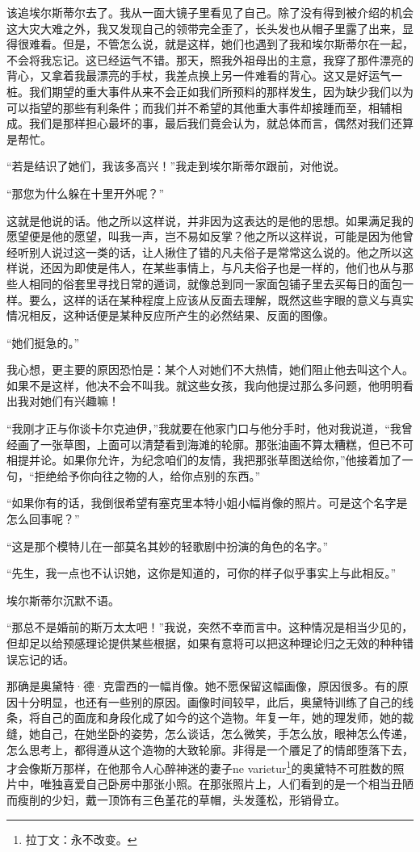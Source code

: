 \par 该追埃尔斯蒂尔去了。我从一面大镜子里看见了自己。除了没有得到被介绍的机会这大灾大难之外，我又发现自己的领带完全歪了，长头发也从帽子里露了出来，显得很难看。但是，不管怎么说，就是这样，她们也遇到了我和埃尔斯蒂尔在一起，不会将我忘记。这已经运气不错。那天，照我外祖母出的主意，我穿了那件漂亮的背心，又拿着我最漂亮的手杖，我差点换上另一件难看的背心。这又是好运气一桩。我们期望的重大事件从来不会正如我们所预料的那样发生，因为缺少我们以为可以指望的那些有利条件；而我们并不希望的其他重大事件却接踵而至，相辅相成。我们是那样担心最坏的事，最后我们竟会认为，就总体而言，偶然对我们还算是帮忙。
\par “若是结识了她们，我该多高兴！”我走到埃尔斯蒂尔跟前，对他说。
\par “那您为什么躲在十里开外呢？”
\par 这就是他说的话。他之所以这样说，并非因为这表达的是他的思想。如果满足我的愿望便是他的愿望，叫我一声，岂不易如反掌？他之所以这样说，可能是因为他曾经听别人说过这一类的话，让人揪住了错的凡夫俗子是常常这么说的。他之所以这样说，还因为即使是伟人，在某些事情上，与凡夫俗子也是一样的，他们也从与那些人相同的俗套里寻找日常的遁词，就像总到同一家面包铺子里去买每日的面包一样。要么，这样的话在某种程度上应该从反面去理解，既然这些字眼的意义与真实情况相反，这种话便是某种反应所产生的必然结果、反面的图像。
\par “她们挺急的。”
\par 我心想，更主要的原因恐怕是：某个人对她们不大热情，她们阻止他去叫这个人。如果不是这样，他决不会不叫我。就这些女孩，我向他提过那么多问题，他明明看出我对她们有兴趣嘛！
\par “我刚才正与你谈卡尔克迪伊，”我就要在他家门口与他分手时，他对我说道，“我曾经画了一张草图，上面可以清楚看到海滩的轮廓。那张油画不算太糟糕，但已不可相提并论。如果你允许，为纪念咱们的友情，我把那张草图送给你，”他接着加了一句，“拒绝给予你向往之物的人，给你点别的东西。”
\par “如果你有的话，我倒很希望有塞克里本特小姐小幅肖像的照片。可是这个名字是怎么回事呢？”
\par “这是那个模特儿在一部莫名其妙的轻歌剧中扮演的角色的名字。”
\par “先生，我一点也不认识她，这你是知道的，可你的样子似乎事实上与此相反。”
\par 埃尔斯蒂尔沉默不语。
\par “那总不是婚前的斯万太太吧！”我说，突然不幸而言中。这种情况是相当少见的，但却足以给预感理论提供某些根据，如果有意将可以把这种理论归之无效的种种错误忘记的话。
\par 那确是奥黛特·德·克雷西的一幅肖像。她不愿保留这幅画像，原因很多。有的原因十分明显，也还有一些别的原因。画像时间较早，此后，奥黛特训练了自己的线条，将自己的面庞和身段化成了如今的这个造物。年复一年，她的理发师，她的裁缝，她自己，在她坐卧的姿势，怎么谈话，怎么微笑，手怎么放，眼神怎么传递，怎么思考上，都得遵从这个造物的大致轮廓。非得是一个餍足了的情郎堕落下去，才会像斯万那样，在他那令人心醉神迷的妻子ne varietur\footnote{拉丁文：永不改变。}的奥黛特不可胜数的照片中，唯独喜爱自己卧房中那张小照。在那张照片上，人们看到的是一个相当丑陋而瘦削的少妇，戴一顶饰有三色堇花的草帽，头发蓬松，形销骨立。
